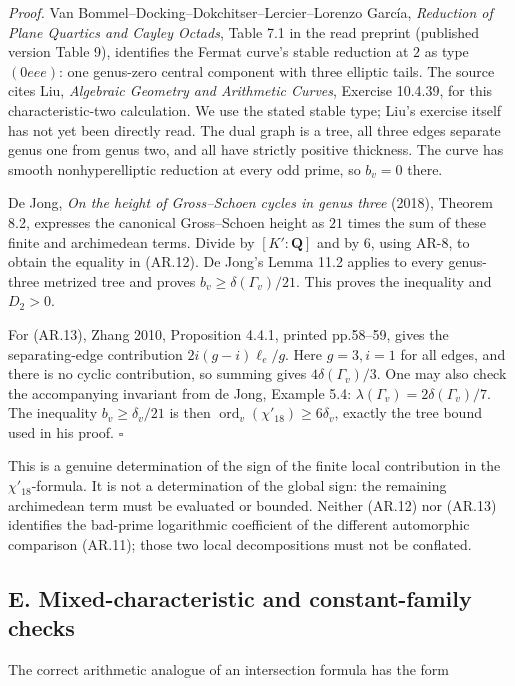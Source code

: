 \emph{Proof.} Van Bommel--Docking--Dokchitser--Lercier--Lorenzo García,
\emph{Reduction of Plane Quartics and Cayley Octads}, Table 7.1 in the
read preprint (published version Table 9), identifies the Fermat curve's
stable reduction at \(2\) as type \((0eee)\): one genus-zero central
component with three elliptic tails. The source cites Liu,
\emph{Algebraic Geometry and Arithmetic Curves}, Exercise 10.4.39, for
this characteristic-two calculation. We use the stated stable type;
Liu's exercise itself has not yet been directly read. The dual graph is
a tree, all three edges separate genus one from genus two, and all have
strictly positive thickness. The curve has smooth nonhyperelliptic
reduction at every odd prime, so \(b_v=0\) there.

De Jong, \emph{On the height of Gross--Schoen cycles in genus three}
(2018), Theorem 8.2, expresses the canonical Gross--Schoen height as
\(21\) times the sum of these finite and archimedean terms. Divide by
\([K':\mathbf Q]\) and by \(6\), using AR-8, to obtain the equality in
(AR.12). De Jong's Lemma 11.2 applies to every genus-three metrized tree
and proves \(b_v\ge\delta(\Gamma_v)/21\). This proves the inequality and
\(D_2>0\).

For (AR.13), Zhang 2010, Proposition 4.4.1, printed pp.58--59, gives the
separating-edge contribution \(2i(g-i)\ell_e/g\). Here \(g=3,i=1\) for
all edges, and there is no cyclic contribution, so summing gives
\(4\delta(\Gamma_v)/3\). One may also check the accompanying invariant
from de Jong, Example 5.4: \(\lambda(\Gamma_v)=2\delta(\Gamma_v)/7\).
The inequality \(b_v\ge\delta_v/21\) is then
\(\operatorname{ord}_v(\chi'_{18})\ge6\delta_v\), exactly the tree bound
used in his proof. \(\square\)

This is a genuine determination of the sign of the finite local
contribution in the \(\chi'_{18}\)-formula. It is not a determination of
the global sign: the remaining archimedean term must be evaluated or
bounded. Neither (AR.12) nor (AR.13) identifies the bad-prime
logarithmic coefficient of the different automorphic comparison (AR.11);
those two local decompositions must not be conflated.

\subsection{E. Mixed-characteristic and constant-family
checks}\label{e.-mixed-characteristic-and-constant-family-checks}

The correct arithmetic analogue of an intersection formula has the form

